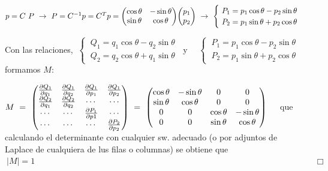 $p= C \ P \ \to \ P= C^{-1} p = C^T p =\mqty(\cos \theta & -\sin \theta \\ \sin \theta & \cos \theta ) \mqty(p_1\\p_2) \ \to \ \begin{cases} \ P_1=p_1 \cos \theta - p_2 \sin \theta \\ \ P_2= p_1\sin \theta + p_2 \cos \theta \end{cases}$

Con las relaciones, $\ \begin{cases}\ Q_1=q_1\cos \theta - q_2 \sin \theta \\ \ Q_2=q_2\cos \theta+q_1\sin \theta    \end{cases} \ $ y $ \quad  \begin{cases} \ P_1=p_1 \cos \theta - p_2 \sin \theta \\ \ P_2= p_1\sin \theta + p_2 \cos \theta \end{cases}\ \ $ formamos $M$:



$M\ = \ \mqty(
\pdv{Q_1}{q_1} & \pdv{Q_1}{q_2} & \pdv{Q_1}{p_1} & \pdv{Q_1}{p_2} \\
\pdv{Q_2}{q_1} & \pdv{Q_2}{q_2} & \cdots & \cdots \\
\cdots & \cdots & \pdv{P_1}{p1} & \cdots \\
\cdots & \cdots & \cdots & \pdv{P_2}{p_2}
) \ = \ 
\mqty(
\cos \theta & - \sin \theta & 0 & 0 \\ 
\sin \theta &  \cos \theta & 0 & 0 \\
0& 0& \cos \theta & - \sin \theta \\
0& 0& \sin \theta &  \cos \theta
)\ \, \ \ $ que calculando el determinante con cualquier sw. adecuado (o por adjuntos de Laplace de cualquiera de lus filas o columnas) se obtiene que $\ |M| = 1 \hspace{14cm} \Box$


\color{Black}

